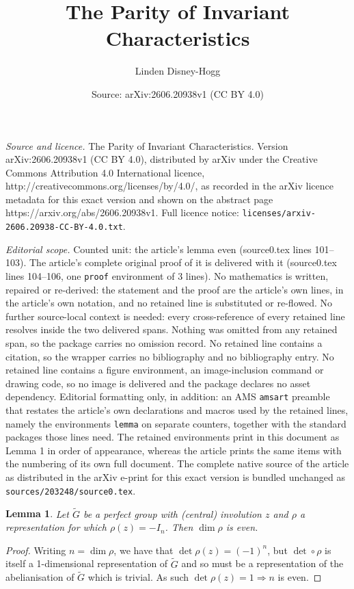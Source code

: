 \documentclass[10pt,a4paper]{amsart}
\title{The Parity of Invariant Characteristics}
\author{Linden Disney-Hogg}
\date{Source: arXiv:2606.20938v1 (CC BY 4.0)}
\newtheorem{lemma}{Lemma}
\begin{document}
\maketitle

\noindent\emph{Source and licence.} The Parity of Invariant Characteristics. Version arXiv:2606.20938v1 (CC BY 4.0), distributed by arXiv under the Creative Commons Attribution 4.0 International licence, http://creativecommons.org/licenses/by/4.0/, as recorded in the arXiv licence metadata for this exact version and shown on the abstract page https://arxiv.org/abs/2606.20938v1. Full licence notice: \texttt{licenses/arxiv-2606.20938-CC-BY-4.0.txt}.\par\smallskip

\noindent\textit{Editorial scope.} Counted unit: the article's lemma even (source0.tex lines 101--103). The article's complete original proof of it is delivered with it (source0.tex lines 104--106, one \texttt{proof} environment of 3 lines). No mathematics is written, repaired or re-derived: the statement and the proof are the article's own lines, in the article's own notation, and no retained line is substituted or re-flowed.  No further source-local context is needed: every cross-reference of every retained line resolves inside the two delivered spans.  Nothing was omitted from any retained span, so the package carries no omission record.  No retained line contains a citation, so the wrapper carries no bibliography and no bibliography entry.  No retained line contains a figure environment, an image-inclusion command or drawing code, so no image is delivered and the package declares no asset dependency.  Editorial formatting only, in addition: an AMS \texttt{amsart} preamble that restates the article's own declarations and macros used by the retained lines, namely the environments \texttt{lemma} on separate counters, together with the standard packages those lines need.  The retained environments print in this document as Lemma 1 in order of appearance, whereas the article prints the same items with the numbering of its own full document.  The complete native source of the article as distributed in the arXiv e-print for this exact version is bundled unchanged as \texttt{sources/203248/source0.tex}.
\begin{lemma}\label{lemma: dim even}
    Let $\tilde{G}$ be a perfect group with (central) involution $z$ and $\rho$ a representation for which $\rho(z)=-I_n$. Then $\dim \rho$ is even. 
\end{lemma}

\begin{proof}
    Writing $n=\dim \rho$, we have that $\det \rho(z) = (-1)^n$, but $\det \circ \rho$ is itself a 1-dimensional representation of $\tilde{G}$ and so must be a representation of the abelianisation of $\tilde{G}$ which is trivial. As such $\det \rho(z) =1 \Rightarrow n$ is even.
\end{proof}
\end{document}
